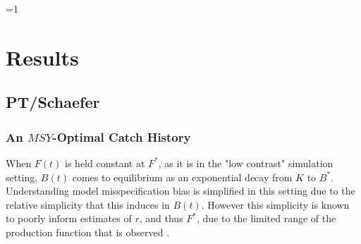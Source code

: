 \documentclass[12pt]{article}
\newcounter{alphasect}
\def\alphainsection{0}
\let\oldsection=\section
\def\section{%
  \ifnum\alphainsection=1%
    \addtocounter{alphasect}{1}
  \fi%
\oldsection}%
\begin{document}
%
%

%
\clearpage

%
\vspace*{-1.5cm}
\section{Results}

%
\subsection{PT/Schaefer}

%
\subsubsection{An $MSY$-Optimal Catch History \label{flat}}

%
When $F(t)$ is held constant at $F^*$, as it is in the "low contrast" 
simulation setting, $B(t)$ comes to equilibrium as an exponential decay from 
$K$ to $B^*$. Understanding model misspecification bias is simplified in this 
setting due to the relative simplicity that this induces in $B(t)$. However 
this simplicity is known to poorly inform estimates of $r$, and thus $F^*$, 
due to the limited range of the production function that is observed 
. 

\end{document}
